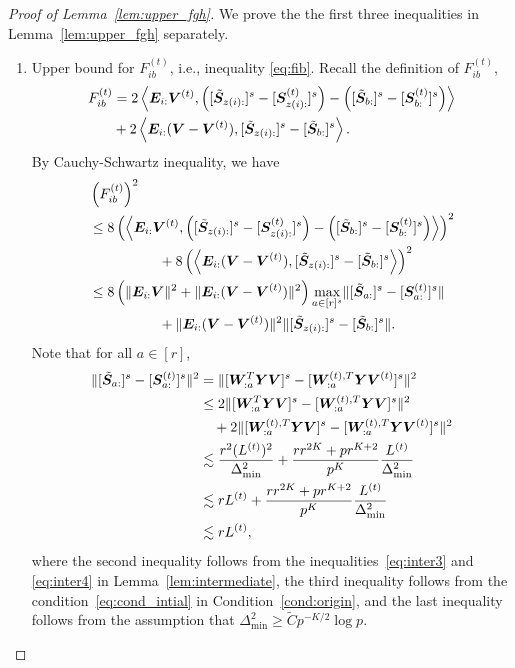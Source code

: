 \documentclass[journal]{IEEEtran}
\theoremstyle{definition}
\theoremstyle{definition}
\newcommand{\of}[1]{\left(#1\right)}
\newcommand{\ang}[1]{\left\langle#1\right\rangle}
\begin{document}
    
\begin{proof}[Proof of Lemma~\ref{lem:upper_fgh}]
We prove the the first three inequalities in Lemma~\ref{lem:upper_fgh} separately.
\begin{enumerate}[wide]
    \item Upper bound for $F_{ib}^{(t)}$, i.e., inequality \eqref{eq:fib}. Recall the definition of $F_{ib}^{(t)}$,
    \small
    \begin{align}
         F_{ib}^{(t)} &= 2 \ang{\mE_{i:} \mV^{(t)}, \of{ [ \tilde \mS_{z(i):} ]^s  - [\mS_{z(i):}^{(t)} ]^s  }  - \of{  [  \tilde \mS_{b:} ]^s  - [ \mS_{b:}^{(t)} ]^s  }  }  \\
         &+ 2 \ang{ \mE_{i:}(\mV - \mV^{(t)} ), [ \tilde \mS_{z(i):} ]^s - [ \tilde \mS_{b:} ]^s  }.
    \end{align}
    \normalsize
    By Cauchy-Schwartz inequality, we have 
    \small
    \begin{align}
        &\of{F_{ib}^{(t)}}^2 \\
        & \leq 8 \of{\ang{\mE_{i:} \mV^{(t)}, \of{ [  \tilde \mS_{z(i):} ]^s  -  [  \mS_{z(i):}^{(t)} ]^s  }  - \of{  [  \tilde \mS_{b:} ]^s  -  [  \mS_{b:}^{(t)} ]^s  }  }  }^2 \\
         & \quad \quad \quad \quad \quad + 8\of{ \ang{ \mE_{i:} (\mV - \mV^{(t)} ), [  \tilde \mS_{z(i):} ]^s - [ \tilde  \mS_{b:} ]^s  }}^2 \\
         & \leq 8 \of{ \onormSize{}{\mE_{i:} \mV}^2 + \onormSize{}{\mE_{i:} ( \mV - \mV^{(t)} )}^2 } \max_{a \in [r]^s} \onormSize{}{  [  \tilde \mS_{a:} ]^s - [   \mS_{a:}^{(t)} ]^s  } \\
          & \quad \quad \quad \quad \quad +\onormSize{}{\mE_{i:} ( \mV - \mV^{(t)} )}^2  \onormSize{}{  [  \tilde \mS_{z(i):} ]^s - [  \tilde \mS_{b:} ]^s  }. \label{eq:fib_decomp}
    \end{align}
    \normalsize
    Note that for all $a \in [r]$,
    \begin{align}
        \onormSize{}{  [  \tilde \mS_{a:} ]^s - [   \mS_{a:}^{(t)} ]^s  }^2 &= \onormSize{}{ [ \mW_{:a}^T \mY \mV ]^s - [ \mW_{:a}^{(t),T} \mY \mV^{(t)} ]^s }^2 \\
        &\leq 2 \onormSize{}{ [ \mW_{:a}^T \mY \mV ]^s  - [ \mW_{:a}^{(t),T} \mY \mV ]^s  }^2 \\
        & \quad + 2 \onormSize{}{[ \mW_{:a}^{(t),T} \mY \mV ]^s - [ \mW_{:a}^{(t),T} \mY \mV^{(t)} ]^s }^2\\
        & \lesssim \frac{ r^2 (L^{(t)})^2}{ \Delta_{\min}^2} + \frac{ r r^{2K} + p r^{K+2}}{p^K} \frac{L^{(t)}}{\Delta_{\min}^2}\\
        & \lesssim  r L^{(t)}+  \frac{ r r^{2K} + p r^{K+2}}{p^K} \frac{L^{(t)}}{\Delta_{\min}^2}\\
        & \lesssim  r L^{(t)},\label{eq:fib_1}
    \end{align}
    where the second inequality follows from the inequalities~\eqref{eq:inter3} and \eqref{eq:inter4} in Lemma~\ref{lem:intermediate}, the third inequality follows from the condition~\eqref{eq:cond_intial} in Condition~\ref{cond:origin}, and the last inequality follows from the assumption that $\Delta_{\min}^2 \geq \tilde C p^{-K/2}\log p$. 
    

\end{enumerate}
\end{proof}
\end{document}
